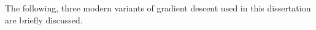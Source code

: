 The following, three modern variants of gradient descent used in this dissertation are briefly discussed.
%
%
%
%



